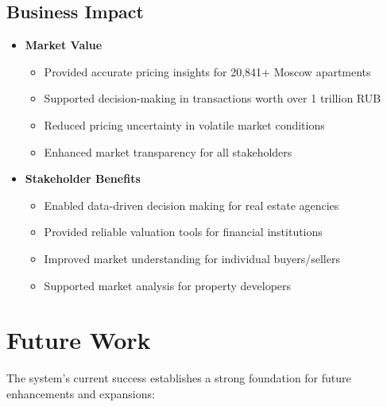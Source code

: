 \documentclass[12pt,a4paper]{report}
\begin{document}
\subsection{Business Impact}
\begin{itemize}
    \item \textbf{Market Value}
    \begin{itemize}
        \item Provided accurate pricing insights for 20,841+ Moscow apartments
        \item Supported decision-making in transactions worth over 1 trillion RUB
        \item Reduced pricing uncertainty in volatile market conditions
        \item Enhanced market transparency for all stakeholders
    \end{itemize}

    \item \textbf{Stakeholder Benefits}
    \begin{itemize}
        \item Enabled data-driven decision making for real estate agencies
        \item Provided reliable valuation tools for financial institutions
        \item Improved market understanding for individual buyers/sellers
        \item Supported market analysis for property developers
    \end{itemize}
\end{itemize}

\section{Future Work}
The system's current success establishes a strong foundation for future enhancements and expansions:
\end{document}
